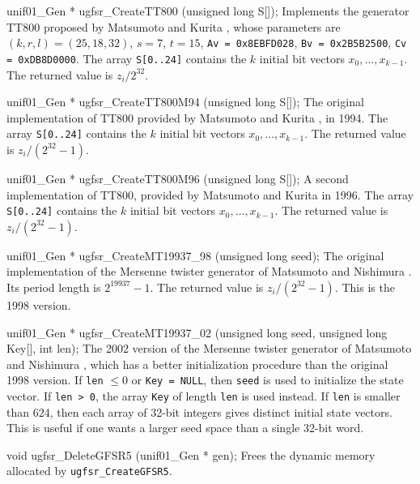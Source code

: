 unif01_Gen * ugfsr_CreateTT800 (unsigned long S[]);
\endcode
  \tab Implements the generator TT800  proposed by
%
   Matsumoto and Kurita \cite{rMAT94a},  whose parameters are
   $(k,r,l) = (25,18,32)$, $s = 7$, $t = 15$, 
   {\tt Av = 0x8EBFD028}, {\tt Bv = 0x2B5B2500}, {\tt Cv = 0xDB8D0000}.
   The array {\tt S[0..24]} contains the $k$ initial bit vectors
   $x_0, \dots, x_{k-1}$.   The returned value is $z_i/2^{32}$. 
  \endtab
\code


unif01_Gen * ugfsr_CreateTT800M94 (unsigned long S[]);
\endcode
  \tab  The original implementation of TT800 provided by 
  Matsumoto and Kurita \cite{rMAT94a}, in 1994.
   The array {\tt S[0..24]} contains the $k$ initial bit vectors
   $x_0, \dots, x_{k-1}$.  The returned value is  $z_i/(2^{32} - 1)$. 
  \endtab
\code


unif01_Gen * ugfsr_CreateTT800M96 (unsigned long S[]);
\endcode
  \tab A second implementation of TT800, provided by Matsumoto 
  and Kurita in 1996. 
   The array {\tt S[0..24]} contains the $k$ initial bit vectors
   $x_0, \dots, x_{k-1}$. The returned value is  $z_i/(2^{32} - 1)$. 
  \endtab
\code


unif01_Gen * ugfsr_CreateMT19937_98 (unsigned long seed);
\endcode
  \tab The original implementation of the Mersenne twister generator
%
  of Matsumoto and Nishimura \cite{rMAT98a}. 
  Its period length is $2^{19937}-1$.
  The returned value is $z_i/(2^{32} - 1)$. This is the 1998 version.
  \endtab
\code


unif01_Gen * ugfsr_CreateMT19937_02 (unsigned long seed,
                                     unsigned long Key[], int len);
\endcode
  \tab The 2002 version of the Mersenne twister generator \label{rng:MT19937}
  of Matsumoto and Nishimura \cite{rMAT98a},  which has a better
  initialization  procedure than the  original 1998 version.
  If {\tt len} $ \le 0$ or {\tt Key = NULL}, then  {\tt seed} is used to
  initialize the state vector. If  {\tt len > 0}, the array {\tt Key} of
   length  {\tt len} is used instead. 
   If  {\tt len} is smaller than 624,
   then each array of 32-bit integers gives distinct initial
   state vectors. This is useful if one  wants a larger seed space
   than a single 32-bit word. 
  \endtab




\code

void ugfsr_DeleteGFSR5 (unif01_Gen * gen);
\endcode
  \tab Frees the dynamic memory allocated by
   {\tt ugfsr\_CreateGFSR5}.
 \endtab
\code


